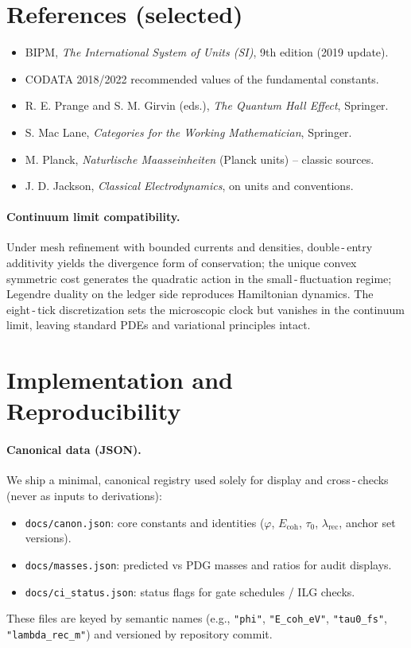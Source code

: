 \documentclass[11pt]{article}
\newcommand{\ph}{\varphi}
\newcommand{\lamrec}{\lambda_{\mathrm{rec}}}
\newcommand{\tauzero}{\tau_{0}}
\newcommand{\Ecoh}{E_{\mathrm{coh}}}
\theoremstyle{remark}
\begin{document}
\section*{References (selected)}
\begin{itemize}
  \item BIPM, \emph{The International System of Units (SI)}, 9th edition (2019 update).
  \item CODATA 2018/2022 recommended values of the fundamental constants.
  \item R. E. Prange and S. M. Girvin (eds.), \emph{The Quantum Hall Effect}, Springer.
  \item S. Mac Lane, \emph{Categories for the Working Mathematician}, Springer.
  \item M. Planck, \emph{Naturlische Maasseinheiten} (Planck units) – classic sources.
  \item J. D. Jackson, \emph{Classical Electrodynamics}, on units and conventions.
\end{itemize}

\paragraph{Continuum limit compatibility.}
Under mesh refinement with bounded currents and densities, double\,\mbox{-}\,entry additivity yields the divergence form of conservation; the unique convex symmetric cost generates the quadratic action in the small\,\mbox{-}\,fluctuation regime; Legendre duality on the ledger side reproduces Hamiltonian dynamics. The eight\,\mbox{-}\,tick discretization sets the microscopic clock but vanishes in the continuum limit, leaving standard PDEs and variational principles intact.

\section{Implementation and Reproducibility}
\paragraph{Canonical data (JSON).}
We ship a minimal, canonical registry used solely for display and cross\,\mbox{-}\,checks (never as inputs to derivations):
\begin{itemize}
  \item \texttt{docs/canon.json}: core constants and identities ($\ph$, $\Ecoh$, $\tauzero$, $\lamrec$, anchor set versions).
  \item \texttt{docs/masses.json}: predicted vs PDG masses and ratios for audit displays.
  \item \texttt{docs/ci\_status.json}: status flags for gate schedules / ILG checks.
\end{itemize}
These files are keyed by semantic names (e.g., \texttt{"phi"}, \texttt{"E\_coh\_eV"}, \texttt{"tau0\_fs"}, \texttt{"lambda\_rec\_m"}) and versioned by repository commit.
\end{document}

